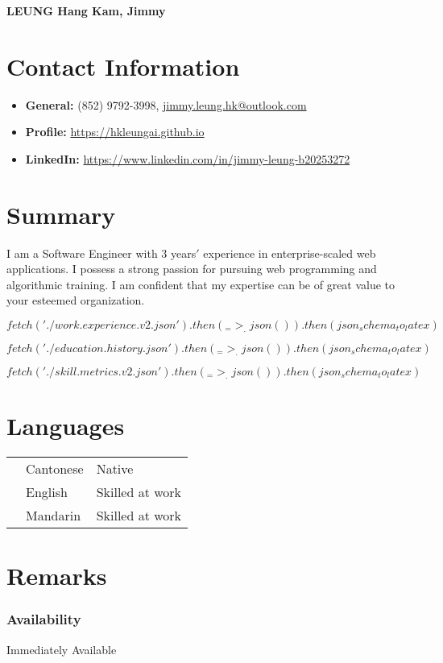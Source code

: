 \documentclass[a4paper, 12pt]{report}
\newcommand{\subheading}[1]{\subsubsection*{#1}}
\newcommand{\heading}[1]{\section*{#1}}
\begin{document}
\begin{center}
    \textbf{\LARGE LEUNG Hang Kam, Jimmy}
\end{center}

\def\mobile{\leavevmode\hbox to7bp{\kern1bp \lower1bp\vbox to12bp{}%
    \pdfliteral{q 0 g 0 G 1 j 2 w 0 0 5 10 re B
       1 g 1 G 1 w .3 1.8 4.4 7 re B 
       1.5 w 2.5 .2 0 .1 re B .3 w 1.7 10 1.6 0 re B Q}%
    \hss}}

\heading{Contact Information}
	
\begin{itemize}
    \setlength\itemsep{0pt}
    \setlength\parsep{0pt}
    \item \textbf{General:} (852) 9792-3998, \href{mailto:jimmy.leung.hk@outlook.com}{jimmy.leung.hk@outlook.com}
    \item \textbf{Profile:} \href{https://hkleungai.github.io}{\url{https://hkleungai.github.io}}
	\item \textbf{LinkedIn:} \href{https://www.linkedin.com/in/jimmy-leung-b20253272}{\url{https://www.linkedin.com/in/jimmy-leung-b20253272}}
\end{itemize}

\heading{Summary}
I am a Software Engineer with 3 years$'$ experience in enterprise-scaled web applications.
I possess a strong passion for pursuing web programming and algorithmic training.
I am confident that my expertise can be of great value to your esteemed organization.

$${fetch('./work.experience.v2.json').then(_ => _.json()).then(json_schema_to_latex)}$$

\newpage 

$${fetch('./education.history.json').then(_ => _.json()).then(json_schema_to_latex)}$$

$${fetch('./skill.metrics.v2.json').then(_ => _.json()).then(json_schema_to_latex)}$$

\heading{Languages}

\begin{tabular}{p{3cm}p{5cm}p{10cm}}
& Cantonese & Native \\
& English & Skilled at work \\
& Mandarin & Skilled at work
\end{tabular}

\heading{Remarks}

\subheading{Availability}

Immediately Available
\end{document}
